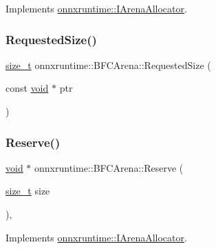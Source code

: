 Implements \mbox{\hyperlink{classonnxruntime_1_1IArenaAllocator_a09710487a52f42135ee804b7d2e2ed71}{onnxruntime\+::\+I\+Arena\+Allocator}}.

\mbox{\label{classonnxruntime_1_1BFCArena_aca9445e29fe31c6a715b249021f9a296}} 
\subsubsection{\texorpdfstring{Requested\+Size()}{RequestedSize()}}
{\footnotesize\ttfamily \mbox{\hyperlink{mlasi_8h_a503efbc1c6e50825320ad909366b78ab}{size\+\_\+t}} onnxruntime\+::\+B\+F\+C\+Arena\+::\+Requested\+Size (\begin{DoxyParamCaption}\item[{const \mbox{\hyperlink{mlasi_8h_a88f941d423cb2a819b70a1358982b1a6}{void}} $\ast$}]{ptr }\end{DoxyParamCaption})}

\mbox{\label{classonnxruntime_1_1BFCArena_a3c5f633150f1f2f4003ee57757c10f11}} 
\subsubsection{\texorpdfstring{Reserve()}{Reserve()}}
{\footnotesize\ttfamily \mbox{\hyperlink{mlasi_8h_a88f941d423cb2a819b70a1358982b1a6}{void}} $\ast$ onnxruntime\+::\+B\+F\+C\+Arena\+::\+Reserve (\begin{DoxyParamCaption}\item[{\mbox{\hyperlink{mlasi_8h_a503efbc1c6e50825320ad909366b78ab}{size\+\_\+t}}}]{size }\end{DoxyParamCaption})\hspace{0.3cm}{\ttfamily [override]}, {\ttfamily [virtual]}}



Implements \mbox{\hyperlink{classonnxruntime_1_1IArenaAllocator_ae39a9a84e17eb83bb779149fb212004a}{onnxruntime\+::\+I\+Arena\+Allocator}}.

\mbox{\label{classonnxruntime_1_1BFCArena_a4e6bd70a40977a1c9db618daa937f9f8}} 
